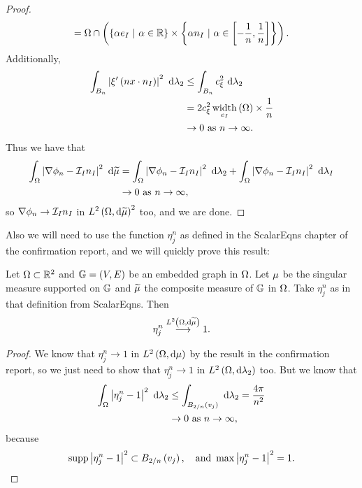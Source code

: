 \documentclass[11pt]{report}
\DeclareMathOperator*{\dw}{width}
\newcommand{\dirWidth}[2]{\dw_{#2}\bracs{#1}}
\begin{document}
\begin{proof}
\begin{align*}
		= \ddom \cap \bracs{\clbracs{\alpha e_I \ \vert \ \alpha\in\reals} \times \clbracs{\alpha n_I \ \vert \ \alpha\in\sqbracs{-\recip{n},\recip{n}}}}.
	\end{align*}
	Additionally,
	\begin{align*}
		\integral{B_n}{\abs{\xi'\bracs{nx\cdot n_I}}^2}{\lambda_2}
		&\leq \integral{B_n}{c_{\xi}^2}{\lambda_2} \\
		&= 2c_{\xi}^2\dirWidth{\ddom}{e_I}\times\recip{n} \\
		&\rightarrow 0 \toInfty{n}.
	\end{align*}
	Thus we have that
	\begin{align*}
		\int_{\Omega}\left\lvert \nabla\phi_n - \mathcal{I}_{I}n_I \right\rvert^2 \ \mathrm{d}\widetilde{\mu}
		&= \int_{\Omega}\left\lvert \nabla\phi_n - \mathcal{I}_{I}n_I \right\rvert^2 \ \mathrm{d}\lambda_2 + \int_{\Omega}\left\lvert \nabla\phi_n - \mathcal{I}_{I}n_I \right\rvert^2 \ \mathrm{d}\lambda_I \\
		&\rightarrow0 \ \text{as} \ n \rightarrow\infty,
	\end{align*}
	so $\nabla\phi_n\rightarrow \mathcal{I}_{I}n_I$ in $L^{2}\left( \Omega,\mathrm{d}\widetilde{\mu} \right)^2$ too, and we are done.
\end{proof}

Also we will need to use the function $\eta^n_j$ as defined in the ScalarEqns chapter of the confirmation report, and we will quickly prove this result:
\begin{lemma} \label{lem:EtaConvCompositeMeasureCase}
	Let $\Omega\subset\mathbb{R}^2$ and $\mathbb{G}=\left( V,E \right)$ be an embedded graph in $\Omega$.
	Let $\mu$ be the singular measure supported on $\mathbb{G}$ and $\widetilde{\mu}$ the composite measure of $\mathbb{G}$ in $\Omega$.
	Take $\eta_j^n$ as in that definition from ScalarEqns.
	Then
	\begin{align*}
		\eta_j^n \overset{L^{2}\left( \Omega,\mathrm{d}\widetilde{\mu} \right)}{\longrightarrow} 1.
	\end{align*}
\end{lemma}
\begin{proof}
	We know that $\eta_j^n\rightarrow 1$ in $L^{2}\left( \Omega,\mathrm{d}\mu \right)$ by the result in the confirmation report, so we just need to show that $\eta_j^n\rightarrow 1$ in $L^{2}\left( \Omega,\mathrm{d}\lambda_2 \right)$ too.
	But we know that
	\begin{align*}
		\int_{\Omega}\left\lvert \eta_j^n - 1 \right\rvert^2 \ \mathrm{d}\lambda_2
		&\leq \int_{B_{2/n}\left( v_j \right)} \ \mathrm{d}\lambda_2 = \frac{4\pi}{n^2} \\
		&\rightarrow 0 \ \text{as} \ n \rightarrow\infty,
	\end{align*}
	because
	\begin{align*}
		\mathrm{supp}\left\lvert \eta_j^n - 1 \right\rvert^2 \subset B_{2/n}\left( v_j \right), \quad\text{and } \max\left\lvert \eta_j^n - 1 \right\rvert^2 = 1.
	\end{align*}
\end{proof}
\end{document}
